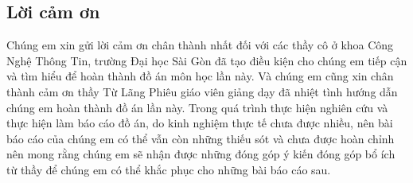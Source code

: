 \documentclass[a4paper]{article}
\begin{document}
\begin{flushleft}
	\dotfill
\end{flushleft}
\begin{flushleft}
	\dotfill
\end{flushleft}
\begin{flushleft}
	\dotfill
\end{flushleft}
\begin{flushleft}
	\dotfill
\end{flushleft}
\begin{flushleft}
	\dotfill
\end{flushleft}
\begin{flushleft}
	\dotfill
\end{flushleft}
\begin{flushleft}
	\dotfill
\end{flushleft}
\begin{flushleft}
	\dotfill
\end{flushleft}
\begin{flushleft}
	\dotfill
\end{flushleft}
\begin{flushleft}
	\dotfill
\end{flushleft}


\newpage
\begin{center}
	\section*{Lời cảm ơn}
\end{center}
\begin{flushleft}
	Chúng em xin gửi lời cảm ơn chân thành nhất đối với các thầy cô ở khoa Công Nghệ Thông Tin, trường Đại học Sài Gòn đã tạo điều kiện cho chúng em tiếp cận và tìm hiểu để hoàn thành đồ án môn học lần này. Và chúng em cũng xin chân thành cảm ơn thầy Từ Lãng Phiêu giáo viên giảng dạy đã nhiệt tình hướng dẫn chúng em hoàn thành đồ án lần này.
	Trong quá trình thực hiện nghiên cứu và thực hiện làm báo cáo đồ án, do kinh nghiệm thực tế chưa được nhiều, nên bài báo cáo của chúng em có thể vẫn còn những thiếu sót và chưa được hoàn chỉnh nên mong rằng chúng em sẽ nhận được những đóng góp ý kiến đóng góp bổ ích từ thầy để chúng em có thể khắc phục cho những bài báo cáo sau.

\end{flushleft}
\begin{flushright}
\end{flushright}
\end{document}
